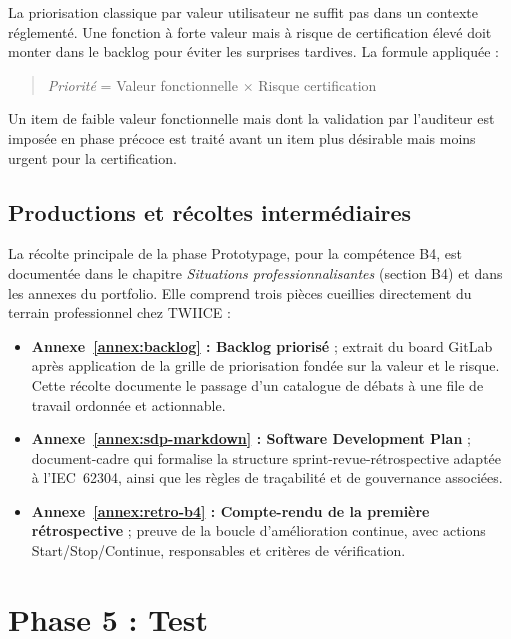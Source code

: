 La priorisation classique par valeur utilisateur ne suffit pas dans un contexte réglementé. Une fonction à forte valeur mais à risque de certification élevé doit monter dans le backlog pour éviter les surprises tardives. La formule appliquée :

\begin{quote}
  \textit{Priorité} = Valeur fonctionnelle $\times$ Risque certification
\end{quote}

Un item de faible valeur fonctionnelle mais dont la validation par l'auditeur est imposée en phase précoce est traité avant un item plus désirable mais moins urgent pour la certification.

\subsection{Productions et récoltes intermédiaires}

La récolte principale de la phase Prototypage, pour la compétence B4, est documentée dans le chapitre \textit{Situations professionnalisantes} (section B4) et dans les annexes du portfolio. Elle comprend trois pièces cueillies directement du terrain professionnel chez TWIICE :

\begin{itemize}
  \item \textbf{Annexe~\ref{annex:backlog} : Backlog priorisé} ; extrait du board GitLab après application de la grille de priorisation fondée sur la valeur et le risque. Cette récolte documente le passage d'un catalogue de débats à une file de travail ordonnée et actionnable.
  \item \textbf{Annexe~\ref{annex:sdp-markdown} : Software Development Plan} ; document-cadre qui formalise la structure sprint-revue-rétrospective adaptée à l'IEC~62304, ainsi que les règles de traçabilité et de gouvernance associées.
  \item \textbf{Annexe~\ref{annex:retro-b4} : Compte-rendu de la première rétrospective} ; preuve de la boucle d'amélioration continue, avec actions Start/Stop/Continue, responsables et critères de vérification.
\end{itemize}

\section{Phase 5 : Test}


